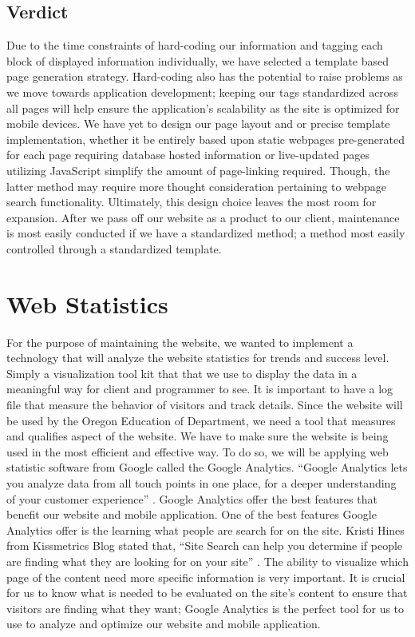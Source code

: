 \documentclass[letterpaper,10pt, draftclsnofoot,onecolumn]{IEEEtran}
\begin{document}
{{{{{{{{{{{{{{{\subsection[Verdict]{\color{black}
Verdict}
{\color{black}\normalsize\noindent
{Due to the time constraints of hard-coding our information and tagging each block of displayed information individually, we have selected a template based page generation strategy. 
Hard-coding also has the potential to raise problems as we move towards application development; keeping our tags standardized across all pages will help ensure the application’s scalability as the site is optimized for mobile devices. 
We have yet to design our page layout and or precise template implementation, whether it be entirely based upon static webpages pre-generated for each page requiring database hosted information or live-updated pages utilizing JavaScript simplify the amount of page-linking required. 
Though, the latter method may require more thought consideration pertaining to webpage search functionality. 
Ultimately, this design choice leaves the most room for expansion. 
After we pass off our website as a product to our client, maintenance is most easily conducted if we have a standardized method; a method most easily controlled through a standardized template.}

\section[Web Statistics ]{\color{black}
Web Statistics}
{\color{black}\normalsize\noindent
{For the purpose of maintaining the website, we wanted to implement a technology that will analyze the website statistics for trends and success level. 
Simply a visualization tool kit that that we use to display the data in a meaningful way for client and programmer to see. 
It is important to have a log file that measure the behavior of visitors and track details.
Since the website will be used by the Oregon Education of Department, we need a tool that measures and qualifies aspect of the website.
We have to make sure the website is being used in the most efficient and effective way. 
To do so, we will be applying web statistic software from Google called the Google Analytics. 
“Google Analytics lets you analyze data from all touch points in one place, for a deeper understanding of your customer experience” \cite{IEEEexample:article9}.
Google Analytics offer the best features that benefit our website and mobile application.
One of the best features Google Analytics offer is the learning what people are search for on the site. 
Kristi Hines from Kissmetrics Blog stated that, “Site Search can help you determine if people are finding what they are looking for on your site” \cite{IEEEexample:article10}.
The ability to visualize which page of the content need more specific information is very important. 
It is crucial for us to know what is needed to be evaluated on the site’s content to ensure that visitors are finding what they want; Google Analytics is the perfect tool for us to use to analyze and optimize our website and mobile application. 
}

}}}}}}}}}}}}}}}}}
\end{document}
